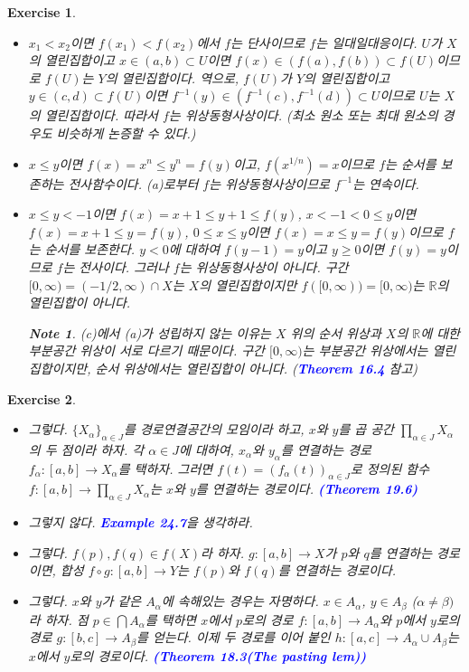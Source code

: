 \documentclass{article}
\newtheorem{exercise}{Exercise}[section]
\newtheorem*{note}{Note}
\newcommand{\R}{\mathbb{R}}
\begin{document}
\begin{exercise}
    \phantom{}
    \begin{itemize}
        \item[(a)] $x_1<x_2$이면 $f(x_1)<f(x_2)$에서 $f$는 단사이므로 $f$는 일대일대응이다. $U$가 $X$의 열린집합이고 $x\in (a,b)\subset U$이면 $f(x)\in (f(a),f(b))\subset f(U)$이므로 $f(U)$는 $Y$의 열린집합이다. 역으로, $f(U)$가 $Y$의 열린집합이고 $y\in (c,d)\subset f(U)$이면 $f^{-1}(y)\in (f^{-1}(c),f^{-1}(d))\subset U$이므로 $U$는 $X$의 열린집합이다. 따라서 $f$는 위상동형사상이다. (최소 원소 또는 최대 원소의 경우도 비슷하게 논증할 수 있다.)
        \item[(b)] $x\leq y$이면 $f(x)=x^n\leq y^n=f(y)$이고, $f(x^{1/n})=x$이므로 $f$는 순서를 보존하는 전사함수이다. (a)로부터 $f$는 위상동형사상이므로 $f^{-1}$는 연속이다.
        \item[(c)] $x\leq y<-1$이면 $f(x)=x+1\leq y+1\leq f(y)$, $x<-1<0\leq y$이면 $f(x)=x+1\leq y=f(y)$, $0\leq x\leq y$이면 $f(x)=x\leq y=f(y)$이므로 $f$는 순서를 보존한다. $y<0$에 대하여 $f(y-1)=y$이고 $y\geq0$이면 $f(y)=y$이므로 $f$는 전사이다. 그러나 $f$는 위상동형사상이 아니다. 구간 $[0,\infty)=(-1/2,\infty)\cap X$는 $X$의 열린집합이지만 $f([0,\infty))=[0,\infty)$는 $\R$의 열린집합이 아니다.
            \begin{note}
                (c)에서 (a)가 성립하지 않는 이유는 $X$ 위의 순서 위상과 $X$의 $\R$에 대한 부분공간 위상이 서로 다르기 때문이다. 구간 $[0,\infty)$는 부분공간 위상에서는 열린집합이지만, 순서 위상에서는 열린집합이 아니다. (\textcolor{blue}{\textbf{Theorem 16.4}} 참고)
            \end{note}
    \end{itemize}
\end{exercise}

\begin{exercise}
	\label{exc:24.8}
    \phantom{}
    \begin{itemize}
        \item[(a)] 그렇다. $\{X_\alpha\}_{\alpha\in J}$를 경로연결공간의 모임이라 하고, $x$와 $y$를 곱 공간 $\prod_{\alpha\in J}X_\alpha$의 두 점이라 하자. 각 $\alpha\in J$에 대하여, $x_\alpha$와 $y_\alpha$를 연결하는 경로 $f_\alpha:[a,b]\to X_\alpha$를 택하자. 그러면 $f(t)=(f_\alpha(t))_{\alpha\in J}$로 정의된 함수 $f:[a,b]\to\prod_{\alpha\in J}X_\alpha$는 $x$와 $y$를 연결하는 경로이다. \textcolor{blue}{\textbf{(Theorem 19.6)}}
        \item[(b)] 그렇지 않다. \textcolor{blue}{\textbf{Example 24.7}}을 생각하라. 
        \item[(c)] 그렇다. $f(p),f(q)\in f(X)$라 하자. $g:[a,b]\to X$가 $p$와 $q$를 연결하는 경로이면, 합성 $f\circ g:[a,b]\to Y$는 $f(p)$와 $f(q)$를 연결하는 경로이다.
        \item[(d)] 그렇다. $x$와 $y$가 같은 $A_\alpha$에 속해있는 경우는 자명하다. $x\in A_\alpha$, $y\in A_\beta$ ($\alpha\ne\beta)$라 하자. 점 $p\in\bigcap A_\alpha$를 택하면 $x$에서 $p$로의 경로 $f:[a,b]\to A_\alpha$와 $p$에서 $y$로의 경로 $g:[b,c]\to A_\beta$를 얻는다. 이제 두 경로를 이어 붙인 $h:[a,c]\to A_\alpha\cup A_\beta$는 $x$에서 $y$로의 경로이다. \textcolor{blue}{\textbf{(Theorem 18.3(The pasting lem))}}
    \end{itemize}
\end{exercise}
\end{document}
